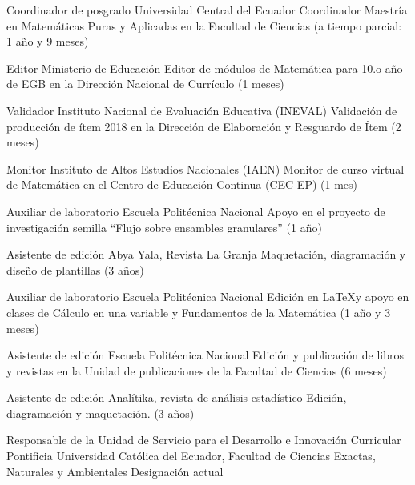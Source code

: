 \documentclass[
	a4paper,
	maincolor=cvblue!70!blue,
	sidecolor=gray!30,
	sectioncolor=cvblue!70!blue,
    sidebarwidth=7.5cm,
	topbottommargin=20pt,
	leftrightmargin=20pt,
]{fortysecondscv}
\begin{document}

    {Coordinador de posgrado}
    {Universidad Central del Ecuador}
    {Coordinador Maestría en Matemáticas Puras y Aplicadas en la Facultad de Ciencias (a tiempo parcial: 1 año y 9 meses)}

    {Editor}
    {Ministerio de Educación}
    {Editor de módulos de Matemática para 10.o año de EGB en la Dirección Nacional de Currículo (1 meses)}

    {Validador}
    {Instituto Nacional de Evaluación Educativa (INEVAL)}
    {Validación de producción de ítem 2018 en la Dirección de Elaboración y Resguardo de Ítem (2 meses)}

    {Monitor}
    {Instituto de Altos Estudios Nacionales (IAEN)}
    {Monitor de curso virtual de Matemática en el Centro de Educación Continua (CEC-EP) (1 mes)}

    {Auxiliar de laboratorio}
    {Escuela Politécnica Nacional}
    {Apoyo en el proyecto de investigación semilla ``Flujo sobre ensambles granulares'' (1 año)}

    {Asistente de edición}
    {Abya Yala, Revista La Granja}
    {Maquetación, diagramación y diseño de plantillas (3 años)}

    {Auxiliar de laboratorio}
    {Escuela Politécnica Nacional}
    {Edición en \LaTeX y apoyo en clases de Cálculo en una variable y Fundamentos de la Matemática (1 año y 3 meses)}

    {Asistente de edición}
    {Escuela Politécnica Nacional}
    {Edición y publicación de libros y revistas en la Unidad de publicaciones de la Facultad de Ciencias (6 meses)}

    {Asistente de edición}
    {Analítika, revista de análisis estadístico}
    {Edición, diagramación y maquetación. (3 años)}


\makebacksidebar


    {Responsable de la Unidad de Servicio para el Desarrollo e Innovación Curricular}
    {Pontificia Universidad Católica del Ecuador, Facultad de Ciencias Exactas, Naturales y Ambientales}
    {Designación actual}
\end{document}
